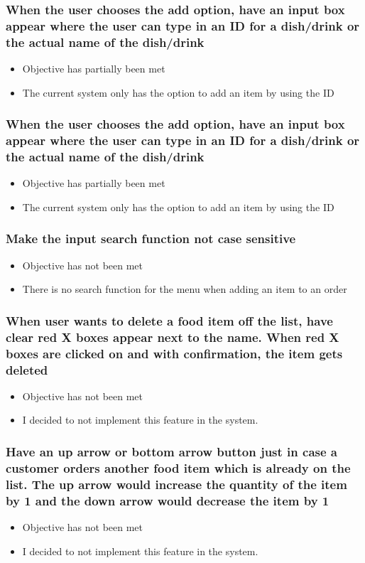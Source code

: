 \subsubsection{When the user chooses the add option, have an input box appear where the user can type in an ID for a dish/drink or the actual name of the dish/drink}
\begin{itemize}
	\item Objective has partially been met
	\item The current system only has the option to add an item by using the ID
\end{itemize}

\subsubsection{When the user chooses the add option, have an input box appear where the user can type in an ID for a dish/drink or the actual name of the dish/drink}
\begin{itemize}
	\item Objective has partially been met
	\item The current system only has the option to add an item by using the ID
\end{itemize}

\subsubsection{Make the input search function not case sensitive}
\begin{itemize}
	\item Objective has not been met
	\item There is no search function for the menu when adding an item to an order
\end{itemize}

\subsubsection{When user wants to delete a food item off the list, have clear red X boxes appear next to the name. When red X boxes are clicked on and with confirmation, the item gets deleted}
\begin{itemize}
	\item Objective has not been met
	\item I decided to not implement this feature in the system.
\end{itemize}

\subsubsection{ Have an up arrow or bottom arrow button just in case a customer orders another food item which is already on the list. The up arrow would increase the quantity of the item by 1 and the down arrow would decrease the item by 1 }
\begin{itemize}
	\item Objective has not been met
	\item I decided to not implement this feature in the system.
\end{itemize}

